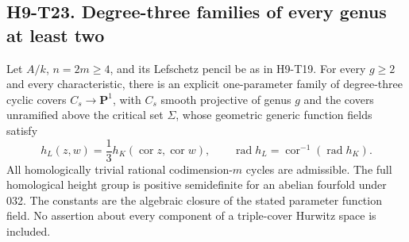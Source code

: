 
\subsection*{H9-T23. Degree-three families of every genus at least two}

\begin{theorem}[H9-T23]
Let $A/k$, $n=2m\ge4$, and its Lefschetz pencil be as in
H9-T19. For every $g\ge2$ and every characteristic,
there is an explicit one-parameter family of degree-three
cyclic covers $C_s\to\mathbf P^1$, with $C_s$ smooth
projective of genus $g$ and the covers unramified above
the critical set $\Sigma$, whose geometric generic
function fields satisfy
\[
 h_L(z,w)=\frac13 h_K(\operatorname{cor}z,
                             \operatorname{cor}w),\qquad
 \operatorname{rad}h_L
       =\operatorname{cor}^{-1}(\operatorname{rad}h_K).
                                                               \tag{H9.126}
\]
All homologically trivial rational codimension-$m$
cycles are admissible. The full homological height
group is positive semidefinite for an abelian fourfold
under 032. The constants are the algebraic closure of
the stated parameter function field. No assertion
about every component of a triple-cover Hurwitz space
is included.
\end{theorem}

